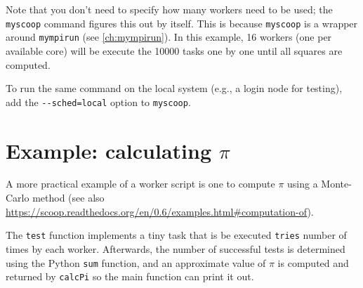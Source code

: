 
Note that you don't need to specify how many workers need to be used; the \lstinline|myscoop|
command figures this out by itself. This is because \lstinline|myscoop| is a wrapper around
\lstinline|mympirun| (see \autoref{ch:mympirun}).
In this example, 16 workers (one per available core) will be
execute the 10000 tasks one by one until all squares are computed.

To run the same command on the local system (e.g., a login node for testing), add
the \lstinline|--sched=local| option to \lstinline|myscoop|.

\section{Example: calculating $\pi$}

A more practical example of a worker script is one to compute $\pi$ using a
Monte-Carlo method (see also \url{https://scoop.readthedocs.org/en/0.6/examples.html#computation-of}).

The \lstinline|test| function implements a tiny task that is be executed \lstinline|tries| number of times by
each worker.
Afterwards, the number of successful tests is determined using the Python \lstinline|sum| function,
and an approximate value of $\pi$ is computed and returned by \lstinline|calcPi| so the main function can print it out.


